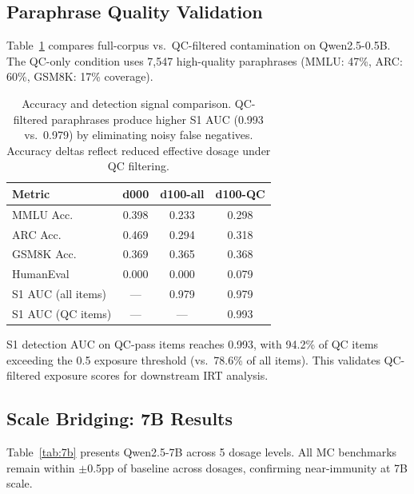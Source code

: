 \documentclass[11pt,a4paper]{article}
\begin{document}
\subsection{Paraphrase Quality Validation}
\label{sec:qc}

Table~\ref{tab:qc} compares full-corpus vs.\ QC-filtered contamination on Qwen2.5-0.5B. The QC-only condition uses 7,547 high-quality paraphrases (MMLU: 47\%, ARC: 60\%, GSM8K: 17\% coverage).

\begin{table}[t]
\centering
\small
\begin{tabular}{lccc}
\toprule
\textbf{Metric} & \textbf{d000} & \textbf{d100-all} & \textbf{d100-QC} \\
\midrule
MMLU Acc. & 0.398 & 0.233 & 0.298 \\
ARC Acc. & 0.469 & 0.294 & 0.318 \\
GSM8K Acc. & 0.369 & 0.365 & 0.368 \\
HumanEval & 0.000 & 0.000 & 0.079 \\
\midrule
S1 AUC (all items) & --- & 0.979 & 0.979 \\
S1 AUC (QC items) & --- & --- & 0.993 \\
\bottomrule
\end{tabular}
\caption{Accuracy and detection signal comparison. QC-filtered paraphrases produce higher S1 AUC (0.993 vs.\ 0.979) by eliminating noisy false negatives. Accuracy deltas reflect reduced effective dosage under QC filtering.}
\label{tab:qc}
\end{table}

S1 detection AUC on QC-pass items reaches 0.993, with 94.2\% of QC items exceeding the 0.5 exposure threshold (vs.\ 78.6\% of all items). This validates QC-filtered exposure scores for downstream IRT analysis.

\subsection{Scale Bridging: 7B Results}

Table~\ref{tab:7b} presents Qwen2.5-7B across 5 dosage levels. All MC benchmarks remain within $\pm$0.5pp of baseline across dosages, confirming near-immunity at 7B scale.
\end{document}
